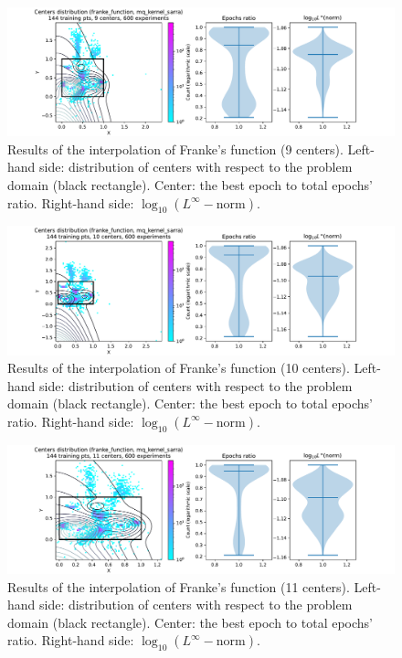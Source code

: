 \documentclass[12pt]{report} %
\begin{document}
\begin{figure}[H]
  \includegraphics[width=\textwidth, trim={2cm 0 2.8cm 0}, clip=true]{imagenes/experiments/2d/franke_interpolation/tr12_c9_franke_function_mq_kernel_sarra.pdf}
  \caption{Results of the interpolation of Franke's function (9 centers).
    Left-hand side: distribution of centers with respect to the problem domain (black rectangle). Center: the best epoch to total epochs' ratio.
    Right-hand side: $\log_{10}(L^\infty-\text{norm})$.}
  \label{fig:franke-tr12-c9-mq}
\end{figure}
\begin{figure}[H]
  \includegraphics[width=\textwidth, trim={2cm 0 2.8cm 0}, clip=true]{imagenes/experiments/2d/franke_interpolation/tr12_c10_franke_function_mq_kernel_sarra.pdf}
  \caption{Results of the interpolation of Franke's function (10 centers).
    Left-hand side: distribution of centers with respect to the problem domain (black rectangle). Center: the best epoch to total epochs' ratio.
    Right-hand side: $\log_{10}(L^\infty-\text{norm})$.}
  \label{fig:franke-tr12-c10-mq}
\end{figure}
\begin{figure}[H]
  \includegraphics[width=\textwidth, trim={2cm 0 2.8cm 0}, clip=true]{imagenes/experiments/2d/franke_interpolation/tr12_c11_franke_function_mq_kernel_sarra.pdf}
  \caption{Results of the interpolation of Franke's function (11 centers).
    Left-hand side: distribution of centers with respect to the problem domain (black rectangle). Center: the best epoch to total epochs' ratio.
    Right-hand side: $\log_{10}(L^\infty-\text{norm})$.}
  \label{fig:franke-tr12-c11-mq}
\end{figure}
\end{document}
